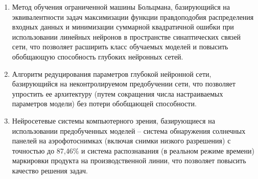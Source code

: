 \begin{enumerate}[wide, labelindent=10mm]
\item Метод обучения ограниченной машины Больцмана, базирующийся на эквивалентности задач максимизации функции правдоподобия распределения входных данных и минимизации суммарной квадратичной ошибки при использовании линейных нейронов в пространстве синаптических связей сети, что позволяет расширить класс обучаемых моделей и повысить обобщающую способность глубоких нейронных сетей.
\item Алгоритм редуцирования параметров глубокой нейронной сети, базирующийся на неконтролируемом предобучении сети, что позволяет упростить ее архитектуру (путем сокращения числа настраиваемых параметров модели) без потери обобщающей способности.
\item Нейросетевые системы компьютерного зрения, базирующиеся на использовании предобученных моделей -- система обнаружения солнечных панелей на аэрофотоснимках (включая снимки низкого разрешения) с точностью до 87,46\% и система распознавания (в реальном режиме времени) маркировки продукта на производственной линии, что позволяет повысить качество решения задач. 
\end{enumerate}

